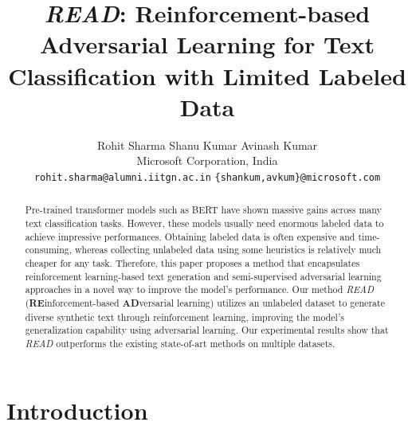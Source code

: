 \documentclass[11pt]{article}
\title{\textit{READ}: Reinforcement-based Adversarial Learning for Text Classification with Limited Labeled Data}
\author{ Rohit Sharma \quad Shanu Kumar \quad Avinash Kumar\\
Microsoft Corporation, India \\
{\tt \small rohit.sharma@alumni.iitgn.ac.in} {\tt \small \{shankum,avkum\}@microsoft.com} }
\begin{document}
\maketitle
\begin{abstract}
Pre-trained transformer models such as BERT have shown massive gains across many text classification tasks. However, these models usually need enormous labeled data to achieve impressive performances. Obtaining labeled data is often expensive and time-consuming, whereas collecting unlabeled data using some heuristics is relatively much cheaper for any task. Therefore, this paper proposes a method that encapsulates reinforcement learning-based text generation and semi-supervised adversarial learning approaches in a novel way to improve the model's performance. Our method \textit{READ} (\textbf{RE}inforcement-based \textbf{AD}versarial learning) utilizes an unlabeled dataset to generate diverse synthetic text through reinforcement learning, improving the model's generalization capability using adversarial learning. Our experimental results show that \textit{READ} outperforms the existing state-of-art methods on multiple datasets. 

\end{abstract}

\section{Introduction}
\label{submission}
\end{document}

